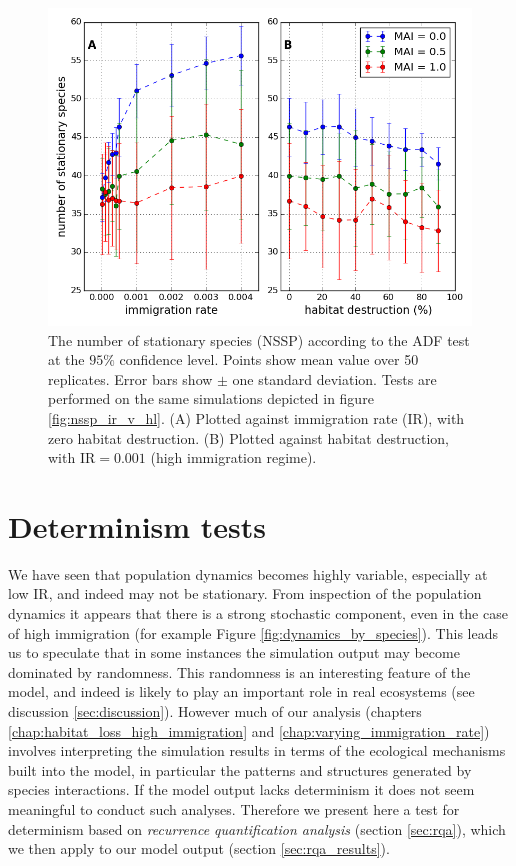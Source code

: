 \begin{figure}[h!]
	\centering
	\includegraphics[width=0.8\linewidth]{"./chapters/chapter04b/figures/nssp_v_ir_and_hl"}
    \caption{The number of stationary species (NSSP) according to the ADF test at the $95\%$ confidence level. Points show mean value over 50 replicates. Error bars show $\pm$ one standard deviation. Tests are performed on the same simulations depicted in figure \ref{fig:nssp_ir_v_hl}. (A) Plotted against immigration rate (IR), with zero habitat destruction. (B) Plotted against habitat destruction, with IR$=0.001$ (high immigration regime). }    
    \label{fig:nssp_v_ir_and_hl}
\end{figure}


\clearpage
\section{Determinism tests}
\label{sec:determinism}

We have seen that population dynamics becomes highly variable, especially at low IR, and indeed may not be stationary. From inspection of the population dynamics it appears that there is a strong stochastic component, even in the case of high immigration (for example Figure \ref{fig:dynamics_by_species}). This leads us to speculate that in some instances the simulation output may become dominated by randomness. This randomness is an interesting feature of the model, and indeed is likely to play an important role in real ecosystems (see discussion \ref{sec:discussion}). However much of our analysis (chapters \ref{chap:habitat_loss_high_immigration} and \ref{chap:varying_immigration_rate}) involves interpreting the simulation results in terms of the ecological mechanisms built into the model, in particular the patterns and structures generated by species interactions. If the model output lacks determinism it does not seem meaningful to conduct such analyses. Therefore we present here a test for determinism based on \emph{recurrence quantification analysis} (section \ref{sec:rqa}), which we then apply to our model output (section \ref{sec:rqa_results}).

